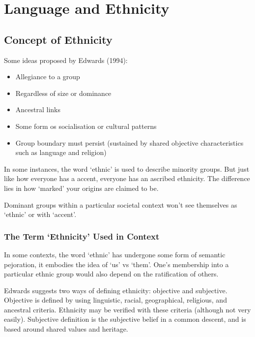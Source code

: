 \documentclass[../main.tex]{subfiles}
\begin{document}
    \section{Language and Ethnicity}
    \subsection{Concept of Ethnicity}
    Some ideas proposed by Edwards (1994): \begin{itemize}
        \item Allegiance to a group
        \item Regardless of size or dominance
        \item Ancestral links
        \item Some form os socialisation or cultural patterns
        \item Group boundary must persist (sustained by shared objective characteristics such as language and religion)
    \end{itemize}
    In some instances, the word `ethnic' is used to describe minority groups. But just like how everyone has a accent, everyone has an ascribed ethnicity. The difference lies in how `marked' your origins are claimed to be. \par 
    Dominant groups within a particular societal context won't see themselves as `ethnic' or with `accent'.

    \subsubsection{The Term `Ethnicity' Used in Context}
    In some contexts, the word `ethnic' has undergone some form of semantic pejoration, it embodies the idea of `us' vs `them'. One's membership into a particular ethnic group would also depend on the ratification of others. \par
    Edwards suggests two ways of defining ethnicity: objective and subjective.
    Objective is defined by using linguistic, racial, geographical, religious, and ancestral criteria. Ethnicity may be verified with these criteria (although not very easily). Subjective definition is the subjective belief in a common descent, and is based around shared values and heritage.
\end{document}
